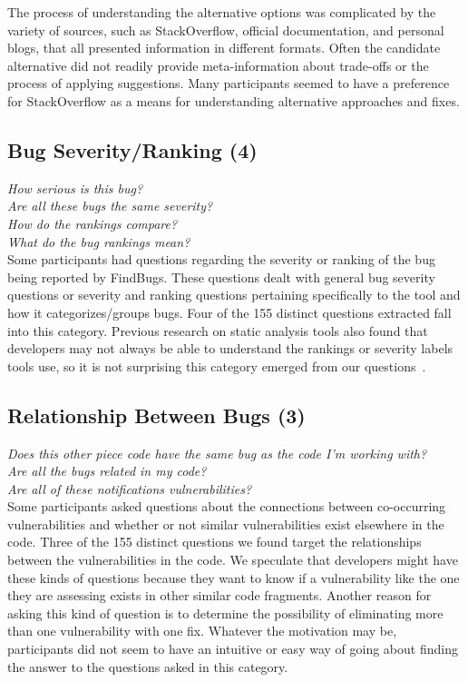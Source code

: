 \documentclass[conference]{IEEEtran}
\begin{document}
The process of understanding the alternative options was complicated by the variety of sources, such as StackOverflow, official documentation, and personal blogs, that all presented information in different formats.  
Often the candidate alternative did not readily provide meta-information about trade-offs or the process of applying suggestions. 
Many participants seemed to have a preference for StackOverflow as a means for understanding alternative approaches and fixes. 

\noindent\subsection{\textbf{Bug Severity/Ranking (4)}}

\noindent\emph{How serious is this bug?} \\
\emph{Are all these bugs the same severity?} \\
\emph{How do the rankings compare?} \\
\emph{What do the bug rankings mean?} \\

Some participants had questions regarding the severity or ranking of the bug being reported by FindBugs. 
These questions dealt with general bug severity questions or severity and ranking questions pertaining specifically to the tool and how it categorizes/groups bugs. 
Four of the 155 distinct questions extracted fall into this category. 
Previous research on static analysis tools also found that developers may not always be able to understand the rankings or severity labels tools use, so it is not surprising this category emerged from our questions~\cite{johnson2013don}.


\noindent\subsection{\textbf{Relationship Between Bugs (3)}}

\noindent\emph{Does this other piece code have the same bug as the code I'm working with?} \\
\emph{Are all the bugs related in my code?} \\
\emph{Are all of these notifications vulnerabilities?} \\

Some participants asked questions about the connections between co-occurring vulnerabilities and whether or not similar vulnerabilities exist elsewhere in the code. 
Three of the 155 distinct questions we found target the relationships between the vulnerabilities in the code. 
We speculate that developers might have these kinds of questions because they want to know if a vulnerability like the one they are assessing exists in other similar code fragments. 
Another reason for asking this kind of question is to determine the possibility of eliminating more than one vulnerability with one fix. 
Whatever the motivation may be, participants did not seem to have an intuitive or easy way of going about finding the answer to the questions asked in this category.
\end{document}
